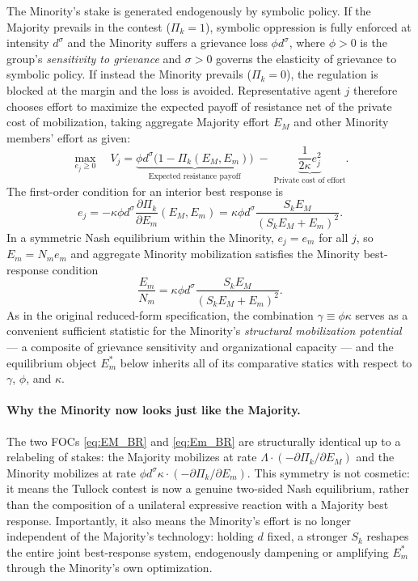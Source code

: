 \documentclass[11pt,twoside]{extarticle}
\begin{document}
The Minority's stake is generated endogenously by symbolic policy. If the Majority prevails in the contest ($\Pi_k=1$), symbolic oppression is fully enforced at intensity $d^\sigma$ and the Minority suffers a grievance loss $\phi d^\sigma$, where $\phi>0$ is the group's \textit{sensitivity to grievance} and $\sigma>0$ governs the elasticity of grievance to symbolic policy. If instead the Minority prevails ($\Pi_k=0$), the regulation is blocked at the margin and the loss is avoided. Representative agent $j$ therefore chooses effort to maximize the expected payoff of resistance net of the private cost of mobilization, taking aggregate Majority effort $E_M$ and other Minority members' effort as given:
\begin{equation}\label{eq:minority_prob}
    \max_{e_j \geq 0} \quad V_j = \underbrace{\phi d^{\sigma}\bigl(1-\Pi_k(E_M,E_m)\bigr)}_{\text{Expected resistance payoff}}\;-\;\underbrace{\frac{1}{2\kappa} e_j^{2}}_{\text{Private cost of effort}}.
\end{equation}
The first-order condition for an interior best response is
\begin{equation} \label{eq:minority_foc}
e_j = -\kappa\phi d^{\sigma}\frac{\partial \Pi_k}{\partial E_m}(E_M,E_m)=\kappa\phi d^{\sigma}\frac{S_k E_M}{(S_k E_M + E_m)^2}.
\end{equation}
In a symmetric Nash equilibrium within the Minority, $e_j=e_m$ for all $j$, so $E_m=N_m e_m$ and aggregate Minority mobilization satisfies the Minority best-response condition
\begin{equation} \label{eq:Em_BR}
\frac{E_m}{N_m}=\kappa\phi d^{\sigma}\frac{S_k E_M}{(S_k E_M + E_m)^2}.
\end{equation}
As in the original reduced-form specification, the combination $\gamma\equiv\phi\kappa$ serves as a convenient sufficient statistic for the Minority's \emph{structural mobilization potential} — a composite of grievance sensitivity and organizational capacity — and the equilibrium object $E_m^*$ below inherits all of its comparative statics with respect to $\gamma$, $\phi$, and $\kappa$.

\paragraph{Why the Minority now looks just like the Majority.} The two FOCs \autoref{eq:EM_BR} and \autoref{eq:Em_BR} are structurally identical up to a relabeling of stakes: the Majority mobilizes at rate $\Lambda\cdot(-\partial\Pi_k/\partial E_M)$ and the Minority mobilizes at rate $\phi d^\sigma\kappa\cdot(-\partial\Pi_k/\partial E_m)$. This symmetry is not cosmetic: it means the Tullock contest is now a genuine two-sided Nash equilibrium, rather than the composition of a unilateral expressive reaction with a Majority best response. Importantly, it also means the Minority's effort is no longer independent of the Majority's technology: holding $d$ fixed, a stronger $S_k$ reshapes the entire joint best-response system, endogenously dampening or amplifying $E_m^*$ through the Minority's own optimization.
\end{document}
